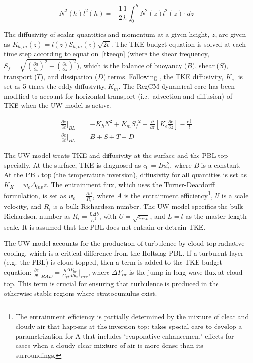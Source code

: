 \begin{equation}\label{uwheight}
N^2(h)l^2(h) = -\frac{1}{2}\frac{1}{h}\int_{0}^{h}N^2(z)l^2(z)\cdot dz 
\end{equation}

The diffusivity of scalar quantities and momentum at a given height, $z$, are
given as $K_{h,m}(z) = l(z) S_{h,m}(z) \sqrt{2 e}$.  The TKE budget equation is
solved at each time step according to equation~\ref{tkeeqn} (where the shear
frequency, $S_f = \sqrt{(\frac{\partial u }{\partial z})^2 + (\frac{\partial v
}{\partial z})^2}$), which is the balance of buoyancy ($B$), shear ($S$),
transport ($T$), and dissipation ($D$) terms.  Following \cite{Grenier_01},
the TKE diffusivity, $K_e$, is set as 5 times the eddy diffusivity, $K_m$.  The
RegCM dynamical core has been modified to account for horizontal transport
(i.e.~advection and diffusion) of TKE when the UW model is active.

\begin{subequations}\label{tkeeqn}
\begin{align}
\frac{\partial e}{\partial t}\Bigr\rvert_{BL}&= -K_h N^2 + K_m {S_f}^2 + \frac{\partial}{\partial z}[K_e \frac{\partial e}{\partial z}] - \frac{e^{\frac{3}{2}}}{l}\\
\frac{\partial e}{\partial t}\Bigr\rvert_{BL}&= B + S + T - D
\end{align}
\end{subequations}

The UW model treats TKE and diffusivity at the surface and the PBL top
specially.  At the surface, TKE is diagnosed as $e_0 = B u_{*}^2$, where $B$ is
a constant.  At the PBL top (the temperature inversion), diffusivity for all
quantities is set as $K_X = w_e \Delta_{inv}z$.  The entrainment flux, which
uses the Turner-Deardorff formulation, is set as $w_e = \frac{A U}{R_i}$, where
$A$ is the entrainment efficiency\footnote{The entrainment efficiency is
  partially determined by the mixture of clear and cloudy air that happens at
the inversion top: \cite{Grenier_01} takes special care to develop a
parametrization for A that includes `evaporative enhancement' effects for cases
when a cloudy-clear mixture of air is more dense than its surroundings.}, $U$
is a scale velocity, and $R_i$ is a bulk Richardson number.  The UW model
specifies the bulk Richardson number as $R_i = \frac{L \Delta b}{U^2}$, with $U
= \sqrt{e_{inv}}$, and $L = l$ as the master length scale.  It is assumed that
the PBL does not entrain or detrain TKE.

The UW model accounts for the production of turbulence by cloud-top radiative
cooling, which is a critical difference from the Holtslag PBL.  If a turbulent
layer (e.g.~the PBL) is cloud-topped, then a term is added to the TKE budget
equation: $\frac{\partial e}{\partial t}\Bigr\rvert_{RAD} = \frac{g \Delta
F_{lw}}{C_p\rho \Pi \theta_v}\rvert_{inv}$, where $\Delta F_{lw}$ is the jump
in long-wave flux at cloud-top.  This term is crucial for ensuring that
turbulence is produced in the otherwise-stable regions where stratocumulus
exist.

